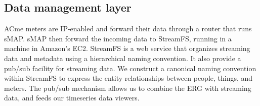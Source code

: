


\subsection{Data management layer}
ACme meters are IP-enabled and forward their data through a router that runs sMAP.  sMAP then forward the incoming data
to StreamFS, running in a machine in Amazon's EC2.  StreamFS is a web service that organizes streaming data and metadata using
a hierarchical naming convention.  It also provide a pub/sub facility for streaming data.  We construct 
a canonical naming convention within StreamFS to express the entity relationships between people, things, and meters.  The pub/sub
mechanism allows us to combine the ERG with streaming data, and feeds our timeseries data viewers.

